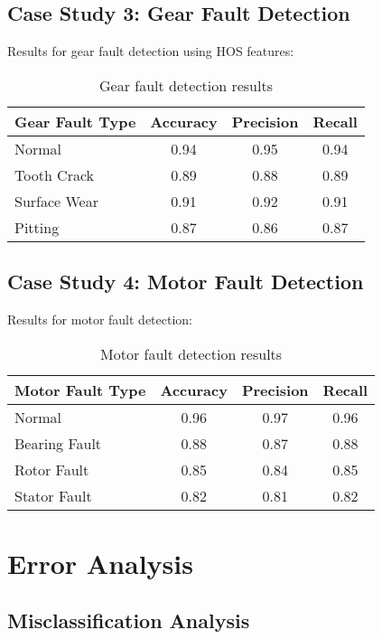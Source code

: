 \subsection{Case Study 3: Gear Fault Detection}

Results for gear fault detection using HOS features:

\begin{table}[H]
\centering
\caption{Gear fault detection results}
\label{tab:gear_fault_results}
\begin{tabular}{@{}lccc@{}}
\toprule
Gear Fault Type & Accuracy & Precision & Recall \\
\midrule
Normal & 0.94 & 0.95 & 0.94 \\
Tooth Crack & 0.89 & 0.88 & 0.89 \\
Surface Wear & 0.91 & 0.92 & 0.91 \\
Pitting & 0.87 & 0.86 & 0.87 \\
\bottomrule
\end{tabular}
\end{table}

\subsection{Case Study 4: Motor Fault Detection}

Results for motor fault detection:

\begin{table}[H]
\centering
\caption{Motor fault detection results}
\label{tab:motor_fault_results}
\begin{tabular}{@{}lccc@{}}
\toprule
Motor Fault Type & Accuracy & Precision & Recall \\
\midrule
Normal & 0.96 & 0.97 & 0.96 \\
Bearing Fault & 0.88 & 0.87 & 0.88 \\
Rotor Fault & 0.85 & 0.84 & 0.85 \\
Stator Fault & 0.82 & 0.81 & 0.82 \\
\bottomrule
\end{tabular}
\end{table}

\section{Error Analysis}

\subsection{Misclassification Analysis}

